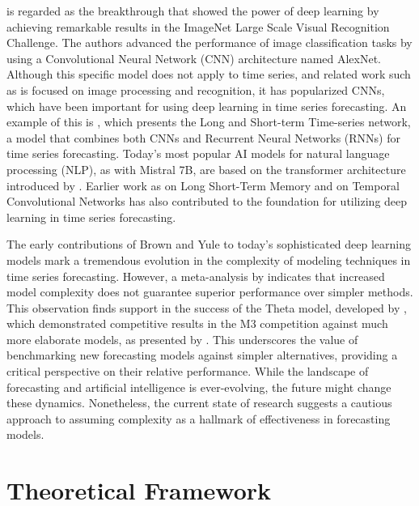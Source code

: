 \documentclass[12pt,a4paper]{article}
\begin{document}
\cite{Krizhevsky2012} is regarded as the breakthrough that showed the power of deep learning by achieving remarkable results in the ImageNet Large Scale Visual Recognition Challenge. The authors advanced the performance of image classification tasks by using a Convolutional Neural Network (CNN) architecture named AlexNet. Although this specific model does not apply to time series, and related work such as \cite{lecun1998gradient} is focused on image processing and recognition, it has popularized CNNs, which have been important for using deep learning in time series forecasting. An example of this is \cite{guokun2018}, which presents the Long and Short-term Time-series network, a model that combines both CNNs and Recurrent Neural Networks (RNNs) for time series forecasting. Today’s most popular AI models for natural language processing (NLP), as \cite{jiang2023mistral} with Mistral 7B, are based on the transformer architecture introduced by \cite{Vaswani2017}. Earlier work as \cite{Hochreiter1997} on Long Short-Term Memory and \cite{bai2018} on Temporal Convolutional Networks has also contributed to the foundation for utilizing deep learning in time series forecasting. 

The early contributions of Brown and Yule to today's sophisticated deep learning models mark a tremendous evolution in the complexity of modeling techniques in time series forecasting. However, a meta-analysis by \cite{Green2015} indicates that increased model complexity does not guarantee superior performance over simpler methods. This observation finds support in the success of the Theta model, developed by \cite{ASSIMAKOPOULOS2000}, which demonstrated competitive results in the M3 competition against much more elaborate models, as presented by \cite{MAKRIDAKIS2000}. This underscores the value of benchmarking new forecasting models against simpler alternatives, providing a critical perspective on their relative performance. While the landscape of forecasting and artificial intelligence is ever-evolving, the future might change these dynamics. Nonetheless, the current state of research suggests a cautious approach to assuming complexity as a hallmark of effectiveness in forecasting models.

\newpage
{\centering \section{Theoretical Framework} \par}
\end{document}
